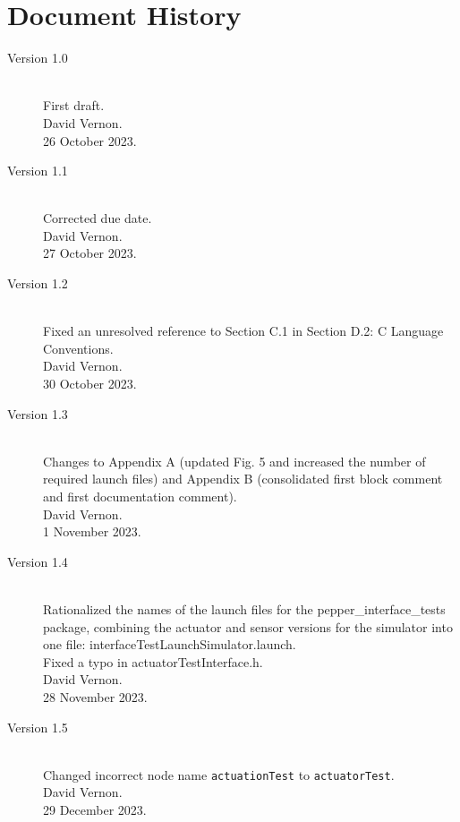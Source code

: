 \documentclass{CSSRforAfrica}
\begin{document}
  

\newpage
\section*{Document History}
\label{document_history}

\begin{description}

\item [Version 1.0]~\\
First draft. \\
David Vernon. \\                               
26 October 2023.      

\item [Version 1.1]~\\
Corrected due date.\\
David Vernon. \\                               
27 October 2023.     

\item [Version 1.2]~\\
Fixed an unresolved reference to Section C.1 in Section D.2: C Language Conventions.\\
David Vernon. \\                               
30 October 2023.   

\item [Version 1.3]~\\
Changes to Appendix A (updated Fig. 5 and increased the number of required launch  files) and Appendix B (consolidated first block comment and first documentation comment).\\
David Vernon. \\                               
1 November 2023.   

\item [Version 1.4]~\\
Rationalized the names of the launch files for the pepper\_interface\_tests package, combining the actuator and sensor versions for the simulator  into one file: interfaceTestLaunchSimulator.launch.\\
Fixed a typo in actuatorTestInterface.h.\\
David Vernon. \\                               
28 November 2023.   

\item [Version 1.5]~\\
Changed incorrect node name {\small \verb+actuationTest+}  to {\small \verb+actuatorTest+}.\\
David Vernon. \\                               
29 December 2023.   


\end{description}
\end{document}
